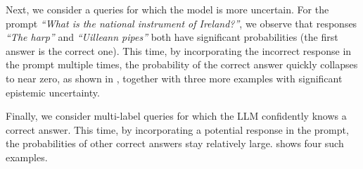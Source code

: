 \documentclass[a4paper]{article}
\theoremstyle{plain}
\theoremstyle{definition}
\theoremstyle{plain}
\begin{document}
Next, we consider a queries for which the model is more uncertain. For the prompt \emph{``What is the national instrument of Ireland?''}, we observe that responses \emph{``The harp''} and \emph{``Uilleann pipes''} both have significant probabilities (the first answer is the correct one). This time, by incorporating the incorrect response in the prompt multiple times, the probability of the correct answer quickly collapses to near zero, as shown in , together with three more examples with significant epistemic uncertainty.

Finally, we consider multi-label queries for which the LLM confidently knows a correct answer. This time, by incorporating a potential response in the prompt, the probabilities of other correct answers stay relatively large.  shows four such examples.
\end{document}
